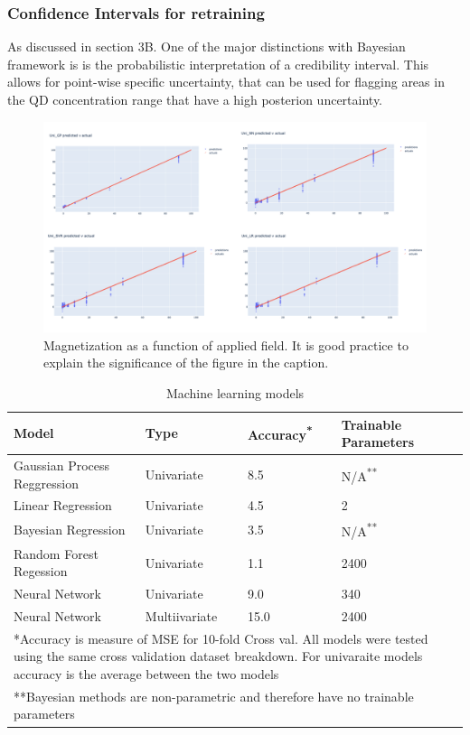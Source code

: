 \documentclass[journal,twoside,web]{ieeecolor}
\begin{document}
\subsubsection{Confidence Intervals for retraining}
{
As discussed in section 3B. One of the major distinctions with Bayesian framework is is the probabilistic interpretation of a credibility interval. This allows for point-wise specific uncertainty, that can be used for flagging areas in the QD concentration range that have a high posterion uncertainty. 

}

\begin{figure}[!t]
\centerline{\includegraphics[width=15cm]{fig1.png}}
\caption{Magnetization as a function of applied field.
It is good practice to explain the significance of the figure in the caption.}
\label{fig1}
\end{figure}



\begin{table}
\caption{Machine learning models}
\label{table}
\setlength{\tabcolsep}{3pt}
\begin{tabular}{|p{100pt}|p{45pt}|p{35pt}|p{50pt}|}
\hline
Model & 
Type& 
Accuracy\textsuperscript{*}   &
Trainable Parameters \\
\hline
Gaussian Process Reggression & 
Univariate& 
8.5   &
N/A\textsuperscript{**} \\
Linear Regression  & 
Univariate & 
4.5   &
2 \\
Bayesian Regression & 
Univariate & 
3.5   &
N/A\textsuperscript{**}  \\
Random Forest Regession & 
Univariate & 
1.1   &
2400 \\
Neural Network & 
Univariate & 
9.0   &
340 \\
Neural Network & 
Multiivariate & 
15.0   &
2400 \\
\hline
\multicolumn{4}{p{251pt}}{*Accuracy is measure of MSE for 10-fold Cross val. All models were tested using the same cross validation dataset breakdown. For univaraite models accuracy is the average between the two models}\\
\multicolumn{4}{p{251pt}}{**Bayesian methods are non-parametric and therefore have no trainable parameters}\\
\end{tabular}
\label{tab1}
\end{table}
\end{document}

